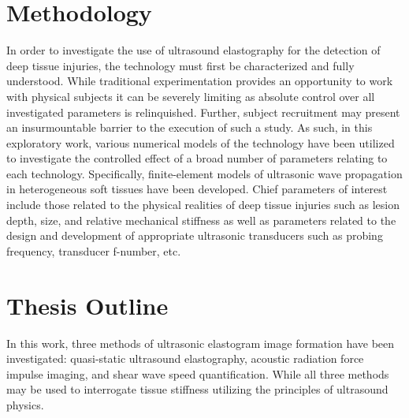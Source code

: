 	\section{Methodology}
		In order to investigate the use of ultrasound elastography for the detection of deep tissue injuries, the technology must first be characterized and fully understood. While traditional experimentation provides an opportunity to work with physical subjects it can be severely limiting as absolute control over all investigated parameters is relinquished. Further, subject recruitment may present an insurmountable barrier to the execution of such a study. As such, in this exploratory work, various numerical models of the technology have been utilized to investigate the controlled effect of a broad number of parameters relating to each technology. Specifically, finite-element models of ultrasonic wave propagation in heterogeneous soft tissues have been developed.  Chief parameters of interest include those related to the physical realities of deep tissue injuries such as lesion depth, size, and relative mechanical stiffness as well as parameters related to the design and development of appropriate ultrasonic transducers such as probing frequency, transducer f-number, etc.

	\section{Thesis Outline}
		In this work, three methods of ultrasonic elastogram image formation have been investigated: quasi-static ultrasound elastography, acoustic radiation force impulse imaging, and shear wave speed quantification. While all three methods may be used to interrogate tissue stiffness utilizing the principles of ultrasound physics.